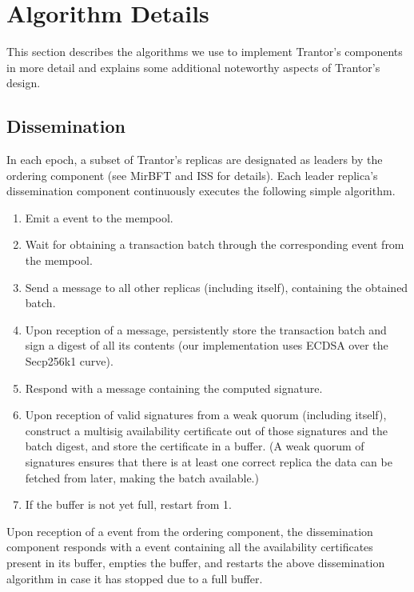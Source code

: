 \documentclass{article}
\begin{document}
\section{Algorithm Details}
\label{sec:algorithm-details}

This section describes the algorithms we use to implement Trantor’s components in more detail
and explains some additional noteworthy aspects of Trantor’s design.

\subsection{Dissemination}
\label{sec:dissemination}

In each epoch, a subset of Trantor’s replicas are designated as leaders by the ordering component
(see MirBFT \cite{mirbft} and ISS \cite{iss} for details).
Each leader replica’s dissemination component continuously executes the following simple algorithm.

\begin{enumerate}
\item Emit a  event to the mempool.
\item Wait for obtaining a transaction batch through the corresponding  event from the mempool.
\item Send a  message to all other replicas (including itself), containing the obtained batch.
\item Upon reception of a  message,
persistently store the transaction batch and sign a digest of all its contents
(our implementation uses ECDSA over the Secp256k1 curve).
\item Respond with a  message containing the computed signature.
\item Upon reception of valid signatures from a weak quorum (including itself),
construct a multisig availability certificate out of those signatures and the batch digest,
and store the certificate in a buffer.
(A weak quorum of signatures ensures that there is at least one correct replica the data can be fetched from later,
making the batch available.)
\item If the buffer is not yet full, restart from 1.
\end{enumerate}

Upon reception of a  event from the ordering component,
the dissemination component responds with a  event
containing all the availability certificates present in its buffer, empties the buffer,
and restarts the above dissemination algorithm in case it has stopped due to a full buffer.
\end{document}
